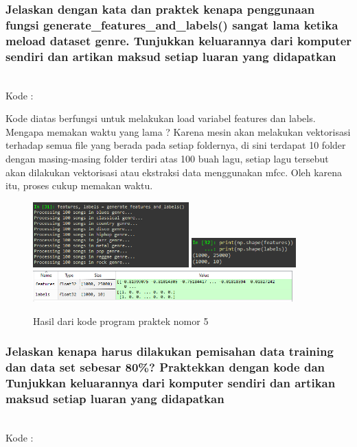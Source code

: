 \subsubsection{Jelaskan dengan kata dan praktek kenapa penggunaan fungsi generate\_features\_and\_labels() sangat lama ketika meload dataset genre. Tunjukkan keluarannya dari komputer sendiri dan artikan maksud setiap luaran yang didapatkan}
\hfill\\
Kode :


Kode diatas berfungsi untuk melakukan load variabel features dan labels. Mengapa memakan waktu yang lama ? Karena mesin akan melakukan vektorisasi terhadap semua file yang berada pada setiap foldernya, di sini terdapat 10 folder dengan masing-masing folder terdiri atas 100 buah lagu, setiap lagu tersebut akan dilakukan vektorisasi atau ekstraksi data menggunakan mfcc. Oleh karena itu, proses cukup memakan waktu.
\begin{figure}[H]
	\centering
	\includegraphics[width=6cm]{figures/1174083/figures6/24.png}
	\includegraphics[width=4cm]{figures/1174083/figures6/26.png}
	\includegraphics[width=10cm]{figures/1174083/figures6/25.png}
	\caption{Hasil dari kode program praktek nomor 5}
\end{figure}

\subsubsection{Jelaskan kenapa harus dilakukan pemisahan data training dan data set sebesar 80\%? Praktekkan dengan kode dan Tunjukkan keluarannya dari komputer sendiri dan artikan maksud setiap luaran yang didapatkan}
\hfill\\
Kode :


